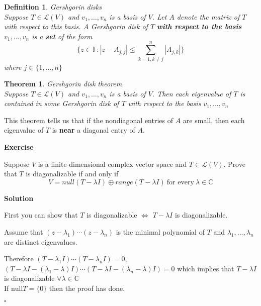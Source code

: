 \documentclass{article}
\newtheorem{theorem}{Theorem}[subsection]
\newtheorem{definition}{Definition}[subsection]
\newenvironment{exercise}{%
{\textbf{Exercise\\}
    }
}{
}
\newenvironment{solution}{%
{
    \textbf{Solution\\}
    }
}{
  \hfill $\square$ 
  \par\bigskip 
}
\newcommand{\CC}{\mathbb{C}}
\newcommand{\FF}{\mathbb{F}}
\newcommand{\n}{\text{null}}
\begin{document}
\begin{CJK}{UTF8}{gkai}
\begin{definition}
    Gershgorin disks\\

    Suppose $T \in \mathcal{L}(V)$ and $v_1,\ldots,v_n$ is a basis of $V$. Let $A$ denote the matrix of $T$ with respect to this basis. A Gershgorin disk of $T$ \textbf{with respect to the basis} $v_1, \ldots,v_n$ is a \textbf{set} of the form
    \[\{z \in \FF : |z - A_{j,j}| \leq \sum_{k = 1, k \neq j}^n |A_{j,k}|\}\]
    where $j \in \{1,\ldots,n\}$
\end{definition}

\begin{theorem}
    Gershgorin disk theorem\\

    Suppose $T \in \mathcal{L}(V)$ and $v_1,\ldots,v_n$ is a basis of $V$. Then each eigenvalue of $T$ is contained in some Gershgorin disk of $T$ with respect to the basis $v_1,\ldots,v_n$
\end{theorem}

This theorem tells us that if the nondiagonal entries of $A$ are small, then each eigenvalue of $T$ is \textbf{near} a diagonal entry of $A$.

\begin{exercise}
    Suppose $V$ is a finite-dimensional complex vector space and $T \in \mathcal{L}(V)$. Prove that $T$ is diagonalizable if and only if
    \[V =null(T - \lambda I)\oplus range(T - \lambda I)~\text{for every}~ \lambda  \in \CC\]
\end{exercise}

\begin{solution}
    First you can show that $T$ is diagonalizable $\Leftrightarrow$ $T - \lambda I$ is diagonalizable.

    Assume that $(z-\lambda_1)\cdots(z-\lambda_n)$ is the minimal polynomial of $T$ and $\lambda_1,\ldots,\lambda_n$ are distinct eigenvalues.

    Therefore $(T - \lambda_1 I)\cdots(T - \lambda_n I) = 0$, $(T - \lambda I - (\lambda_1 - \lambda) I) \cdots (T - \lambda I - (\lambda_n - \lambda) I)= 0$ which implies that $T - \lambda I$ is diagonalizable $\forall \lambda \in \CC$\\

    If $\n T = \{0\}$ then the proof has done.


\end{solution}
\end{CJK}
\end{document}
